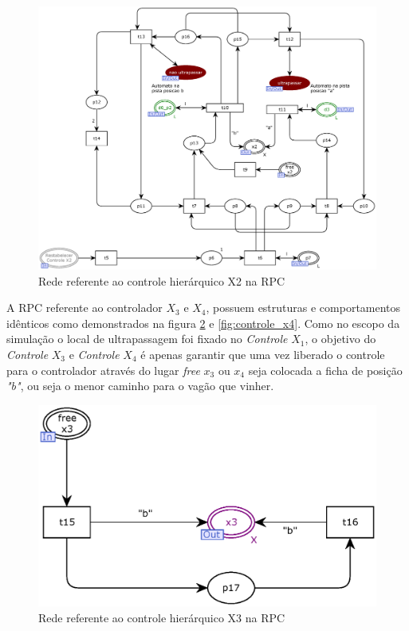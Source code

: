 \begin{figure}[ht]
    \centering
    \caption{Rede referente ao controle hierárquico X2 na RPC}
    \label{fig:controle_x2}
    \includegraphics[width=0.9\linewidth]{figures//Simulation//Modelagem/controle_x2.eps}
\end{figure}

A RPC referente ao controlador $X_3$ e $X_4$, possuem estruturas e comportamentos idênticos como demonstrados na figura \ref{fig:controle_x3} e \ref{fig:controle_x4}. Como no escopo da simulação o local de ultrapassagem foi fixado no \textit{Controle} $X_1$, o objetivo do \textit{Controle} $X_3$ e \textit{Controle} $X_4$ é apenas garantir que uma vez liberado o controle para o controlador através do lugar \textit{free} $x_3$ ou $x_4$ seja colocada a ficha de posição \textit{"b"}, ou seja o menor caminho para o vagão que vinher.

\begin{figure}[ht]
    \centering
    \caption{Rede referente ao controle hierárquico X3 na RPC}
    \label{fig:controle_x3}
    \includegraphics[width=0.6\linewidth]{figures//Simulation//Modelagem/controle_x3.eps}
\end{figure}


